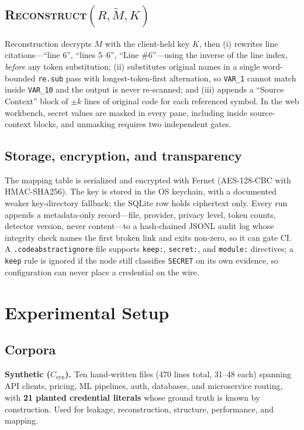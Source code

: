 \documentclass[conference]{IEEEtran}
\begin{document}
\subsection{\textsc{Reconstruct}$(R,\tilde{M},K)$}

Reconstruction decrypts $M$ with the client-held key $K$, then (i)
rewrites line citations---``line 6'', ``lines 5--6'', ``Line \#6''---using
the inverse of the line index, \emph{before} any token substitution; (ii)
substitutes original names in a single word-bounded \texttt{re.sub} pass
with longest-token-first alternation, so \texttt{VAR\_1} cannot match
inside \texttt{VAR\_10} and the output is never re-scanned; and (iii)
appends a ``Source Context'' block of $\pm k$ lines of original code for
each referenced symbol. In the web workbench, secret values are masked in
every pane, including inside source-context blocks, and unmasking requires
two independent gates.

\subsection{Storage, encryption, and transparency}

The mapping table is serialized and encrypted with Fernet (AES-128-CBC
with HMAC-SHA256). The key is stored in the OS keychain, with a documented
weaker key-directory fallback; the SQLite row holds ciphertext only. Every
run appends a metadata-only record---file, provider, privacy level, token
counts, detector version, never content---to a hash-chained JSONL audit
log whose integrity check names the first broken link and exits non-zero,
so it can gate CI. A \texttt{.codeabstractignore} file supports
\texttt{keep:}, \texttt{secret:}, and \texttt{module:} directives; a
\texttt{keep} rule is ignored if the node still classifies \texttt{SECRET}
on its own evidence, so configuration can never place a credential on the
wire.

\section{Experimental Setup}
\label{sec:setup}

\subsection{Corpora}

\textbf{Synthetic ($C_{\text{syn}}$).} Ten hand-written files (470 lines
total, 31--48 each) spanning API clients, pricing, ML pipelines, auth,
databases, and microservice routing, with \textbf{21 planted credential
literals} whose ground truth is known by construction. Used for leakage,
reconstruction, structure, performance, and mapping.
\end{document}
